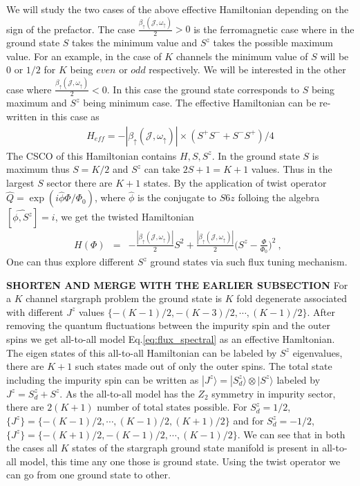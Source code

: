\documentclass[reprint,prb,superscriptaddress]{revtex4-2}
\begin{document}
We will study the two cases of the above effective Hamiltonian depending on the sign of the prefactor. The case $\frac{\beta_{\uparrow}({\mathcal{J}},\omega_{\uparrow})}{2} >0$ is the ferromagnetic case where in the ground state $S$ takes the minimum value and $S^z$ takes the possible maximum value. For an example, in the case of $K$ channels the minimum value of $S$ will be $0$ or $1/2$ for $K$ being $even $ or $odd$ respectively.  We will be interested in the other case where $\frac{\beta_{\uparrow}({\mathcal{J}},\omega_{\uparrow})}{2} <0$. In this case the ground state corresponds to $S$ being maximum and $S^z$ being minimum case. The effective Hamiltonian can be re-written in this case as
\begin{eqnarray}
H_{eff}   =-|\beta_{\uparrow}({\mathcal{J}},\omega_{\uparrow})| \times(S^+S^{-}+ S^-S^{+}) /4   
\end{eqnarray}
\noindent The CSCO of this Hamiltonian contains $H,S,S^z$. In the ground state $S$ is maximum thus $S=K/2$ and $S^z$ can take $2S+1=K+1$ values. Thus in the largest $S$ sector there are $K+1$ states. By the application of twist operator $\hat{Q}=\exp(i\hat{\phi}\Phi/\Phi_0)$, where $\hat{\phi}$ is the conjugate to $S6z$ folloing the algebra $[\hat{\phi,S^z}]=i$, we get the twisted Hamiltonian 
\begin{eqnarray}
H(\Phi) &=& -\frac{|\beta_{\uparrow}({\mathcal{J}},\omega_{\uparrow})|}{2} S^2   +\frac{|\beta_{\uparrow}({\mathcal{J}},\omega_{\uparrow})|}{2} \bigg(S^{z}-\frac{\Phi}{\Phi_0} \bigg)^2 ~,~~
\label{eq:flux_spectral}
\end{eqnarray}
One can thus explore different $S^z$ ground states via such flux tuning mechanism.


\textbf{SHORTEN AND MERGE WITH THE EARLIER SUBSECTION}
For a $K$ channel stargraph problem the ground state is $K$ fold degenerate associated with different $J^z$ values $\{-(K-1)/2,-(K-3)/2,\cdots  ,(K-1)/2 \}$. After removing the quantum fluctuations between the impurity spin and the outer spins we get all-to-all model Eq.\eqref{eq:flux_spectral} as an effective Hamltonian. The eigen states of this all-to-all Hamiltonian can be labeled by $S^z$ eigenvalues, there are $K+1$ such states made out of only the outer spins. The total state including the impurity spin can be written as $|J^z\rangle = |S_d^z\rangle \otimes |S^z\rangle$ labeled by $J^z=S_d^z+S^z$. As the all-to-all model has the $Z_2$ symmetry in impurity sector, there are $2(K+1)$ number of total states possible. For $S_d^z=1/2$, $ \{J^z\}=\{ -(K-1)/2, \cdots, (K-1)/2, (K+1)/2 \}$ and for $S_d^z=-1/2$, $\{J^z\}=\{-(K+1)/2, -(K-1)/2, \cdots,  (K-1)/2  \}$. We can see that in both the cases all $K$ states of the stargraph ground state manifold is present in all-to-all model, this time any one those is ground state. Using the twist operator we can go from one ground state to other.
\end{document}
